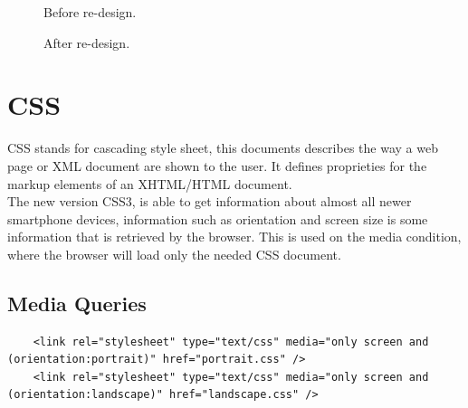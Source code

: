 \begin{figure}[h!]
	\center
		\setlength\fboxsep{0pt}
		\setlength\fboxrule{1pt}
   	\caption{Before re-design.}
\end{figure}


\begin{figure}[h!]
	\center
		\setlength\fboxsep{0pt}
		\setlength\fboxrule{1pt}
   	\caption{After re-design.}
\end{figure}

\newpage

\section{CSS}  %

CSS stands for cascading style sheet, this documents describes the way a web page or XML document are shown to the user. It defines proprieties for the markup elements of an XHTML/HTML document.
\\
The new version CSS3, is able to get information about almost all newer smartphone devices, information such as orientation and screen size is some information that is retrieved by the browser. This is used on the media condition, where the browser will load only the needed CSS document.

\subsection{Media Queries}

\begin{lstlisting}
	<link rel="stylesheet" type="text/css" media="only screen and (orientation:portrait)" href="portrait.css" />
	<link rel="stylesheet" type="text/css" media="only screen and (orientation:landscape)" href="landscape.css" />
\end{lstlisting}

